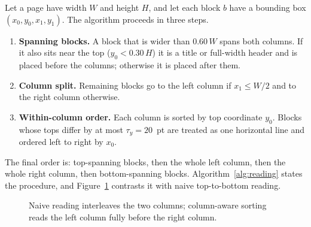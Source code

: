 \documentclass[12pt,a4paper]{report}
\begin{document}
Let a page have width $W$ and height $H$, and let each block $b$ have a bounding box
$(x_0,y_0,x_1,y_1)$. The algorithm proceeds in three steps.
\begin{enumerate}
  \item \textbf{Spanning blocks.} A block that is wider than $0.60\,W$ spans both
  columns. If it also sits near the top ($y_0 < 0.30\,H$) it is a title or full-width
  header and is placed before the columns; otherwise it is placed after them.
  \item \textbf{Column split.} Remaining blocks go to the left column if $x_1 \le W/2$
  and to the right column otherwise.
  \item \textbf{Within-column order.} Each column is sorted by top coordinate $y_0$.
  Blocks whose tops differ by at most $\tau_y = 20$~pt are treated as one horizontal
  line and ordered left to right by $x_0$.
\end{enumerate}
The final order is: top-spanning blocks, then the whole left column, then the whole
right column, then bottom-spanning blocks. Algorithm~\ref{alg:reading} states the
procedure, and Figure~\ref{fig:reading} contrasts it with naive top-to-bottom reading.

\begin{figure}[!htbp]
\centering
{}
\caption{Naive reading interleaves the two columns; column-aware sorting reads the left
column fully before the right column.}
\label{fig:reading}
\end{figure}
\end{document}

